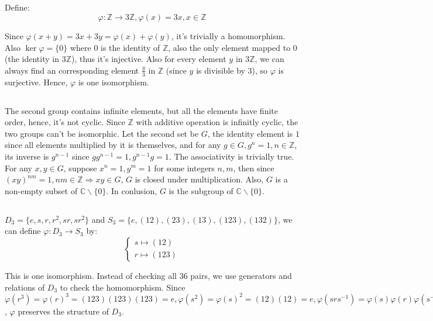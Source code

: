 \documentclass[12pt]{article}
\begin{document}
\subsection{} %
Define:
$$\varphi:\mathbb{Z}\rightarrow 3\mathbb Z,\varphi(x)=3x,x\in\mathbb Z$$ 

Since $\varphi(x+y)=3x+3y=\varphi(x)+\varphi(y)$, it's trivially a homomorphism. Also $\ker{\varphi}=\{0\}$ where $0$ is the identity of $\mathbb Z$, also the only element mapped to $0$ (the identity in $3\mathbb Z$), thus it's injective. Also for every element $y$ in $3\mathbb Z$, we can always find an corresponding element $\frac{y}{3}$ in $\mathbb Z$ (since $y$ is divisible by $3$), so $\varphi$ is surjective. Hence, $\varphi$ is one isomorphism.

\subsection{} %
The second group contains infinite elements, but all the elements have finite order, hence, it's not cyclic. Since $\mathbb Z$ with additive operation is infinitly cyclic, the two groups can't be isomorphic. Let the second set be $G$, the identity element is $1$ since all elements multiplied by it is themselves, and for any $g\in G,g^n=1,n\in\mathbb Z$, its inverse is $g^{n-1}$ since $gg^{n-1}=1,g^{n-1}g=1$. The associativity is trivially true. For any $x,y\in G$, suppose $x^n=1,y^m=1$ for some integers $n,m$, then since $(xy)^{nm}=1,nm\in\mathbb Z\Rightarrow xy\in G$, $G$ is closed under multiplication. Also, $G$ is a non-empty subset of $\mathbb{C}\backslash\{0\}$. In conlusion, $G$ is the subgroup of $\mathbb{C}\backslash\{0\}$.
\subsection{} %
$D_3=\{e,s,r,r^2,sr,sr^2\}$ and $S_3=\{e,(12),(23),(13),(123),(132)\}$, we can define $\varphi:D_3\rightarrow S_3$ by:
$$\begin{cases}s\mapsto (12) \\ r\mapsto (123)\end{cases}$$

This is one isomorphism. Instead of checking all 36 pairs, we use generators and relations of $D_3$ to check the homomorphism. Since $\varphi(r^3)=\varphi(r)^3=(123)(123)(123)=e,\varphi(s^2)=\varphi(s)^2=(12)(12)=e,\varphi(srs^{-1})=\varphi(s)\varphi(r)\varphi(s^{-1})=(12)(123)(12)=(132)=(123)^{-1}$, $\varphi$ preserves the structure of $D_3$.
\end{document}
